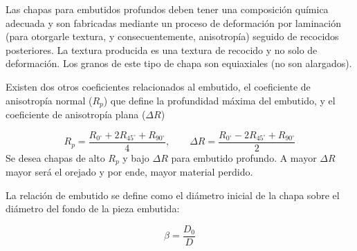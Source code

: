 Las chapas para embutidos profundos deben tener una composición química adecuada y son fabricadas mediante un proceso de deformación por laminación (para otorgarle textura, y consecuentemente, anisotropía) seguido de recocidos posteriores. La textura producida es una textura de recocido y no solo de deformación. Los granos de este tipo de chapa son equiaxiales (no son alargados).

Existen dos otros coeficientes relacionados al embutido, el coeficiente de anisotropía normal ($R_p$) que define la profundidad máxima del embutido, y el coeficiente de anisotropía plana ($\Delta R$)

\begin{equation}
	R_p = \frac{R_{0^\circ} + 2R_{45^\circ} + R_{90^\circ}}{4}, \qquad \Delta R = \frac{R_{0^\circ} - 2R_{45^\circ} + R_{90^\circ}}{2}
\end{equation}
Se desea chapas de alto $R_p$ y bajo $\Delta R$ para embutido profundo. A mayor $\Delta R$ mayor será el orejado y por ende, mayor material perdido.

La relación de embutido se define como el diámetro inicial de la chapa sobre el diámetro del fondo de la pieza embutida:

\begin{equation}
	\beta = \frac{D_0}{D}
\end{equation}